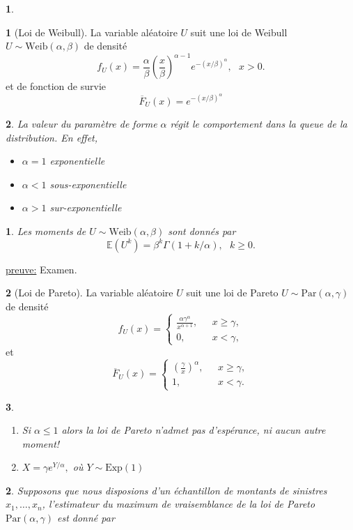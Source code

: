 \documentclass[8pt,notheorems]{beamer}
\def \E{\mathbb E}
\newtheorem{prop}{\translate{Proposition}}
\newtheorem{remark}{\translate{Remark}}
\theoremstyle{definition}
\newtheorem{definition}{\translate{Definition}}
\theoremstyle{example}
\theoremstyle{mystyle}
\theoremstyle{plain}
\begin{document}
\begin{frame}[allowframebreaks]
\begin{remark}
\end{remark}
\begin{definition}[Loi de Weibull]
La variable aléatoire $U$ suit une loi de Weibull $U\sim\text{Weib}(\alpha,\beta)$ de densité
$$
f_{U}(x)=\frac{\alpha}{\beta}\left(\frac{x}{\beta}\right)^{\alpha-1}e^{-(x/\beta)^\alpha},\text{ }x>0.
$$
et de fonction de survie
$$
\overline{F}_U(x) =e^{-(x/\beta)^\alpha}
$$
\end{definition}
\begin{remark}
La valeur du paramètre de forme $\alpha$ régit le comportement dans la queue de la distribution. En effet,
\begin{itemize}
  \item $\alpha = 1$ exponentielle
  \item $\alpha < 1$ sous-exponentielle
  \item $\alpha > 1$ sur-exponentielle
\end{itemize}
\end{remark}
\begin{prop}
Les moments de $U\sim\text{Weib}(\alpha,\beta)$ sont donnés par
$$
\E\left(U^k\right)=\beta^k\Gamma(1+k/\alpha),\text{ }k\geq0.
$$
\end{prop}
\underline{preuve:} Examen.
\begin{definition}[Loi de Pareto]
La variable aléatoire $U$ suit une loi de Pareto $U\sim\text{Par}(\alpha,\gamma)$ de densité
$$
f_{U}(x)=
\begin{cases}
\frac{\alpha \gamma^\alpha}{x^{\alpha+1}},&\text{ }x\geq \gamma,\\
0,&\text{ }x< \gamma,
\end{cases}
$$
et
$$
\overline{F}_{U}(x)=
\begin{cases}
\left(\frac{\gamma}{x}\right)^\alpha,&\text{ }x\geq \gamma,\\
1,&\text{ }x< \gamma.
\end{cases}
$$
\end{definition}
\begin{remark}
\begin{enumerate}
\item Si $\alpha \leq 1$ alors la loi de Pareto n'admet pas d'espérance, ni aucun autre moment!
\item $X =  \gamma e^{Y/\alpha},$ où $Y\sim\text{Exp}(1)$
\end{enumerate}
\end{remark}
\begin{prop}
Supposons que nous disposions d'un échantillon de montants de sinistres $x_1,\ldots, x_n$, l'estimateur du maximum de vraisemblance de la loi de Pareto $\text{Par}(\alpha, \gamma)$ est donné par

\end{prop}
\end{frame}
\end{document}
